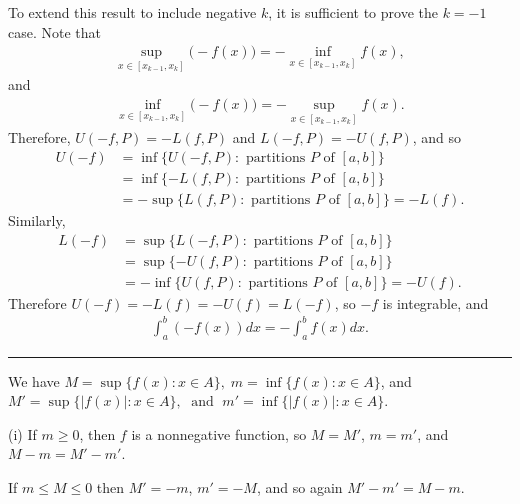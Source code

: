 \documentclass[letterpaper,10pt,english]{jupyterBook}
\begin{document}
\sphinxAtStartPar
To extend this result to include negative \(k\), it is sufficient to prove the \(k=-1\) case. Note that
\begin{equation*}
\begin{split}
\sup_{x\in[x_{k-1},x_k]}\big(-f(x)\big) = -\inf_{x\in[x_{k-1},x_k]}f(x),
\end{split}
\end{equation*}
\sphinxAtStartPar
and
\begin{equation*}
\begin{split}
\inf_{x\in[x_{k-1},x_k]}\big(-f(x)\big) = -\sup_{x\in[x_{k-1},x_k]}f(x).
\end{split}
\end{equation*}
\sphinxAtStartPar
Therefore, \(U(-f,P)=-L(f,P)\) and \(L(-f,P)=-U(f,P)\), and so
\begin{align*}
U(-f) &= \inf\{U(-f,P):\text{ partitions } P \text{ of } [a,b]\} \\
&= \inf\{-L(f,P):\text{ partitions } P \text{ of } [a,b]\} \\
&= -\sup\{L(f,P):\text{ partitions } P \text{ of } [a,b]\} = -L(f).
\end{align*}
\sphinxAtStartPar
Similarly,
\begin{align*}
L(-f) &= \sup\{L(-f,P):\text{ partitions } P \text{ of } [a,b]\} \\
&= \sup\{-U(f,P):\text{ partitions } P \text{ of } [a,b]\} \\
&= -\inf\{U(f,P):\text{ partitions } P \text{ of } [a,b]\} = -U(f).
\end{align*}
\sphinxAtStartPar
Therefore \(U(-f) = -L(f) = -U(f) = L(-f)\), so \(-f\) is integrable, and
\begin{equation*}
\begin{split}
\int_a^b(-f(x))dx = -\int_a^b f(x)dx.
\end{split}
\end{equation*}

\bigskip\hrule\bigskip


\sphinxAtStartPar
{\hyperref[\detokenize{Problems:id71}]{}} We have \(M=\sup\{f(x):x\in A\}, \; m=\inf\{f(x):x\in A\}\), and \(M'=\sup\{|f(x)|:x\in A\}, \; \text{ and } \; m'=\inf\{|f(x)|:x\in A\}\).

\sphinxAtStartPar
(i) If \(m\geq 0\), then \(f\) is a non\sphinxhyphen{}negative function, so \(M=M'\), \(m=m'\), and \(M-m=M'-m'\).

\sphinxAtStartPar
If \(m\leq M\leq 0\) then \(M'=-m\), \(m'=-M\), and so again \(M'-m'=M-m\).
\end{document}
